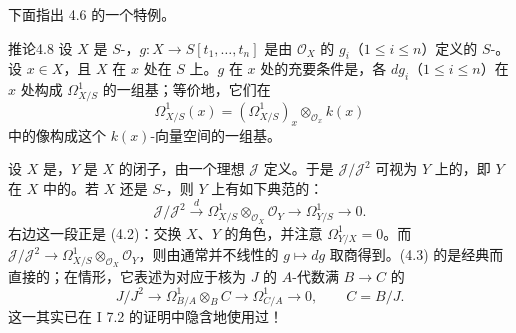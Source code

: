 下面指出 4.6 的一个特例。
\begin{SGAresult}{推论}{4.8}
设 $X$ 是 $S$-，$g:X\to S[t_1,\ldots,t_n]$ 是由 $\mathcal O_X$ 的 $g_i$（$1\leq i\leq n$）定义的 $S$-。设 $x\in X$，且 $X$ 在 $x$ 处在 $S$ 上。$g$ 在 $x$ 处的充要条件是，各 $dg_i$（$1\leq i\leq n$）在 $x$ 处构成 $\Omega^1_{X/S}$ 的一组基；等价地，它们在
\[
\Omega^1_{X/S}(x)=(\Omega^1_{X/S})_x\otimes_{\mathcal O_x}k(x)
\]
中的像构成这个 $k(x)$-向量空间的一组基。
\end{SGAresult}

设 $X$ 是，$Y$ 是 $X$ 的闭子，由一个理想 $\mathcal J$ 定义。于是 $\mathcal J/\mathcal J^2$ 可视为 $Y$ 上的，即 $Y$ 在 $X$ 中的。若 $X$ 还是 $S$-，则 $Y$ 上有如下典范的：
\[
\mathcal J/\mathcal J^2\xrightarrow{\ d\ }
\Omega^1_{X/S}\otimes_{\mathcal O_X}\mathcal O_Y
\longrightarrow\Omega^1_{Y/S}\longrightarrow0.\tag{4.3}
\]
右边这一段正是 (4.2)：交换 $X$、$Y$ 的角色，并注意 $\Omega^1_{Y/X}=0$。而 $\mathcal J/\mathcal J^2\to\Omega^1_{X/S}\otimes_{\mathcal O_X}\mathcal O_Y$，则由通常并不线性的 $g\mapsto dg$ 取商得到。(4.3) 的是经典而直接的；在情形，它表述为对应于核为 $J$ 的 $A$-代数满 $B\to C$ 的
\[
J/J^2\longrightarrow\Omega^1_{B/A}\otimes_B C
\longrightarrow\Omega^1_{C/A}\longrightarrow0,
\qquad C=B/J.\tag{4.3bis}
\]
这一其实已在 I 7.2 的证明中隐含地使用过！

